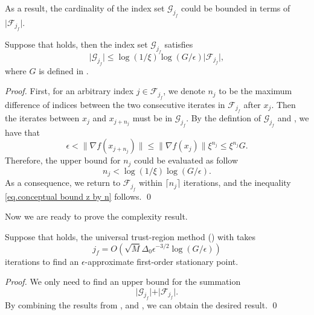 As a result, the cardinality of the index set $\mathcal{G}_{j_f}$ could be bounded in terms of $\vert \mathcal{F}_{j_f} \vert$. 
\begin{lemma}
    Suppose that  holds, then the index set $\mathcal{G}_{j_f}$ satisfies
    \label{lem.conceptual bound z by n}
    \begin{equation}
        \label{eq.conceptual bound z by n}
        \vert \mathcal{G}_{j_f} \vert \leq\log(1/\xi) \log (G/\epsilon) \vert \mathcal{F}_{j_f} \vert,
    \end{equation}
    where $G$ is defined in .
\end{lemma}
\begin{proof}
    First, for an arbitrary index $j\in \mathcal{F}_{j_f}$, we denote $n_{j}$ to be the maximum difference of indices between the two consecutive iterates in $\mathcal{F}_{j_f}$ after $x_j$. Then the iterates between $x_j$ and $x_{j+n_{j}}$ must be in $\mathcal{G}_{j_f}$.
    By the defintion of $\mathcal{G}_{j_f}$ and , we have that
      \begin{equation*}
        \epsilon<\|\nabla f(x_{j+n_j})\|\leq \|\nabla f(x_j)\|\xi^{n_j}\leq \xi^{n_j}G.
    \end{equation*}
    Therefore,
    the upper bound for $n_{j}$ could be evaluated as follow
    \begin{equation*}
     n_j < \log(1/\xi) \log (G/\epsilon).
    \end{equation*}
    As a consequence, we return to $\mathcal F_{j_f}$ within $\lceil{n_j}\rceil$ iterations, and the inequality \eqref{eq.conceptual bound z by n} follows.
\smartqed \qed \end{proof}
Now we are ready to prove the complexity result.
\begin{theorem}
    \label{thm.conceptual final complexity}
    Suppose that  holds,
    the universal trust-region method () with  takes
    \begin{equation*}
        j_f=O\left(\sqrt{M}\Delta_0\epsilon^{-3/2}\log(G/\epsilon)\right)
    \end{equation*}
    iterations to find an $\epsilon$-approximate first-order stationary point.
\end{theorem}
\begin{proof}
    We only need to find an upper bound for the summation
    \begin{equation*}
        \vert \mathcal{G}_{j_f} \vert + \vert \mathcal{F}_{j_f} \vert.
    \end{equation*}
    By combining the results from ,  and , we can obtain the desired result.
\smartqed \qed \end{proof}
